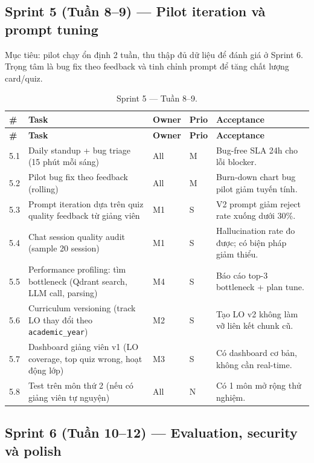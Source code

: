 \subsection{Sprint 5 (Tuần 8--9) --- Pilot iteration và prompt tuning}
\label{subsec:sprint5-gd2}

Mục tiêu: pilot chạy ổn định 2 tuần, thu thập đủ dữ liệu để đánh giá ở
Sprint 6. Trọng tâm là bug fix theo feedback và tinh chỉnh prompt để
tăng chất lượng card/quiz.

\begin{longtable}{|p{0.7cm}|p{6.3cm}|p{1.2cm}|p{1cm}|p{3cm}|}
    \caption{Sprint 5 --- Tuần 8--9.}
    \label{tab:sprint5-gd2} \\
    \hline
    \textbf{\#} & \textbf{Task} & \textbf{Owner} & \textbf{Prio} & \textbf{Acceptance} \\
    \hline
    \endfirsthead
    \hline
    \textbf{\#} & \textbf{Task} & \textbf{Owner} & \textbf{Prio} & \textbf{Acceptance} \\
    \hline
    \endhead

    5.1 & Daily standup + bug triage (15 phút mỗi sáng) & All & M & Bug-free SLA 24h cho lỗi blocker. \\ \hline
    5.2 & Pilot bug fix theo feedback (rolling) & All & M & Burn-down chart bug pilot giảm tuyến tính. \\ \hline
    5.3 & Prompt iteration dựa trên quiz quality feedback từ giảng viên & M1 & S & V2 prompt giảm reject rate xuống dưới 30\%. \\ \hline
    5.4 & Chat session quality audit (sample 20 session) & M1 & S & Hallucination rate đo được; có biện pháp giảm thiểu. \\ \hline
    5.5 & Performance profiling: tìm bottleneck (Qdrant search, LLM call, parsing) & M4 & S & Báo cáo top-3 bottleneck + plan tune. \\ \hline
    5.6 & Curriculum versioning (track LO thay đổi theo \texttt{academic\_year}) & M2 & S & Tạo LO v2 không làm vỡ liên kết chunk cũ. \\ \hline
    5.7 & Dashboard giảng viên v1 (LO coverage, top quiz wrong, hoạt động lớp) & M3 & S & Có dashboard cơ bản, không cần real-time. \\ \hline
    5.8 & Test trên môn thứ 2 (nếu có giảng viên tự nguyện) & All & N & Có 1 môn mở rộng thử nghiệm. \\ \hline
\end{longtable}

\subsection{Sprint 6 (Tuần 10--12) --- Evaluation, security và polish}
\label{subsec:sprint6-gd2}


